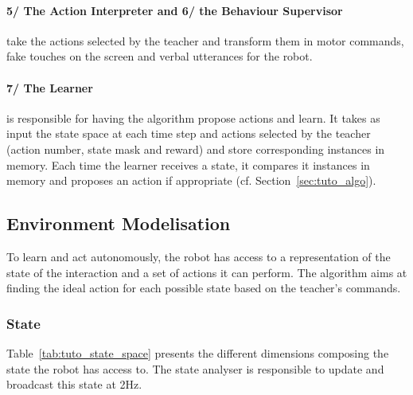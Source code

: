 \paragraph{5/ The Action Interpreter and 6/ the Behaviour Supervisor} take the actions selected by the teacher and transform them in motor commands, fake touches on the screen and verbal utterances for the robot.

\paragraph{7/ The Learner} is responsible for having the algorithm propose actions and learn. It takes as input the state space at each time step and actions selected by the teacher (action number, state mask and reward) and store corresponding instances in memory. Each time the learner receives a state, it compares it instances in memory and proposes an action if appropriate (cf. Section~\ref{sec:tuto_algo}).

\subsection{Environment Modelisation}

To learn and act autonomously, the robot has access to a representation of the state of the interaction and a set of actions it can perform. The algorithm aims at finding the ideal action for each possible state based on the teacher's commands.

\subsubsection{State}\label{sec:tuto_state}

Table~\ref{tab:tuto_state_space} presents the different dimensions composing the state the robot has access to. The state analyser is responsible to update and broadcast this state at 2Hz.

